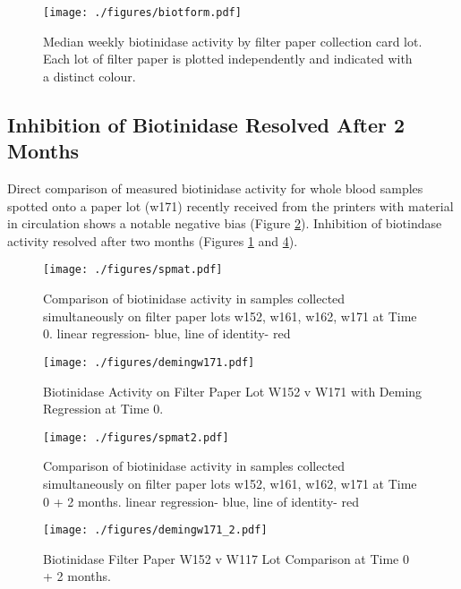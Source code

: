 \documentclass[review]{elsarticle}
\begin{document}
\begin{figure}[htbp]
\centering
\texttt{[image: ./figures/biotform.pdf]}
\caption{\label{fig:org42b1ffa}Median weekly biotinidase activity by filter paper collection card lot. Each lot of filter paper is plotted independently and indicated with a distinct colour.}
\end{figure}

\clearpage

\subsection*{Inhibition of Biotinidase Resolved After 2 Months}
\label{sec:org9344b79}
Direct comparison of measured biotinidase activity for whole blood
samples spotted onto a paper lot (w171) recently received from the
printers with material in circulation shows a notable negative
bias (Figure \ref{fig:orgee3cbff}). Inhibition of biotindase activity resolved after two months
(Figures \ref{fig:org42b1ffa} and \ref{fig:orgae22985}).

\begin{figure}[htbp]
\centering
\texttt{[image: ./figures/spmat.pdf]}
\caption{\label{fig:orgee3cbff}Comparison of biotinidase activity in samples collected simultaneously on filter paper lots w152, w161, w162, w171 at Time 0. linear regression- blue, line of identity- red}
\end{figure}

\begin{figure}[htbp]
\centering
\texttt{[image: ./figures/demingw171.pdf]}
\caption{\label{fig:org107ef6b}Biotinidase Activity on Filter Paper Lot W152 v W171 with Deming Regression at Time 0.}
\end{figure}
\clearpage

\begin{figure}[htbp]
\centering
\texttt{[image: ./figures/spmat2.pdf]}
\caption{\label{fig:orgae22985}Comparison of biotinidase activity in samples collected simultaneously on filter paper lots w152, w161, w162, w171 at Time 0 + 2 months. linear regression- blue, line of identity- red}
\end{figure}

\begin{figure}[htbp]
\centering
\texttt{[image: ./figures/demingw171\_2.pdf]}
\caption{\label{fig:orgcd32bb7}Biotinidase Filter Paper W152 v W117 Lot Comparison at Time 0 + 2 months.}
\end{figure}
\end{document}
